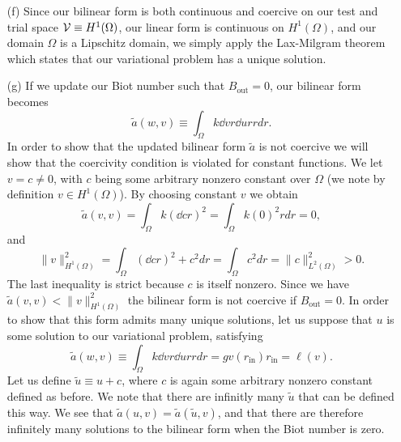 \documentclass{article}
\begin{document}
\begin{itemize}
	\item[(f)] Since our bilinear form is both continuous and coercive on our test and trial space \(\mathcal{V} \equiv H^1(\Omega) \), our linear form is continuous on \(H^1(\Omega) \), and our domain \(\Omega \) is a Lipschitz domain, we simply apply the Lax-Milgram theorem which states that our variational problem has a unique solution. 
	
	\item[(g)] If we update our Biot number such that \(B_\text{out} = 0\), our bilinear form becomes
	\begin{equation}
		\tilde{a}(w,v) \equiv \int_{\Omega} k\dd{v}{r}\dd{u}{r} rdr.
	\end{equation}
	In order to show that the updated bilinear form \(\tilde{a} \) is not coercive we will show that the coercivity condition is violated for constant functions. We let \(v = c \neq 0 \), with \(c\) being some arbitrary nonzero constant over \(\Omega \) (we note by definition \(v\in H^1(\Omega) \)). By choosing constant \(v\) we obtain
	\begin{equation}
		\tilde{a}(v,v) = \int_\Omega k \left(\dd{c}{r}\right)^2 = \int_\Omega k \left(0\right)^2 rdr = 0,
	\end{equation}
	and
	\begin{equation}
		\|v\|^2_{H^1(\Omega)} = \int_\Omega \left(\dd{c}{r}\right)^2 + c^2 dr =  \int_\Omega c^2 dr = \|c\|^2_{L^2(\Omega)} > 0.
	\end{equation}
	The last inequality is strict because \(c\) is itself nonzero. Since we have \(\tilde{a}(v,v) < \|v\|^2_{H^1(\Omega)}\) the bilinear form is not coercive if \(B_\text{out} = 0 \). In order to show that this form admits many unique solutions, let us suppose that \(u\) is some solution to our variational problem, satisfying
	\begin{equation}
		\tilde{a}(w,v) \equiv \int_{\Omega} k\dd{v}{r}\dd{u}{r} rdr = gv(r_\text{in})r_\text{in} = \ell(v).
	\end{equation}
	Let us define \(\tilde{u} \equiv u + c \), where \(c\) is again some arbitrary nonzero constant defined as before. We note that there are infinitly many \(\tilde{u} \) that can be defined this way. We see that \(\tilde{a}(u,v) = \tilde{a}(\tilde{u},v) \), and that there are therefore infinitely many solutions to the bilinear form when the Biot number is zero. 
	

\end{itemize}
\end{document}
